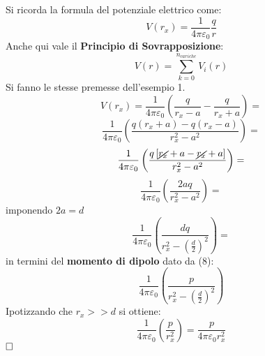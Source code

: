 Si ricorda la formula del potenziale elettrico come:
$$
  V(r_x) = \frac{1}{4 \pi \varepsilon_0}\frac{q}{r}
$$ 
Anche qui vale il \textbf{Principio di Sovrapposizione}:
$$
  V(r) = \sum_{k = 0}^{n_{cariche}}{V_i(r)}
$$
Si fanno le stesse premesse dell'esempio 1.\\
$$ V(r_x) = \frac{1}{4 \pi \varepsilon_0} \left(\frac{q}{r_x - a} - \frac{q}{r_x + a}\right) =
$$
$$
\frac{1}{4 \pi \varepsilon_0} \left(\frac{q(r_x + a) - q(r_x - a)}{r_x^2 - a^2}\right) = 
$$
$$
\frac{ 1 }{ 4 \pi \varepsilon_0 } \left( \frac{ q \left[ \cancel{ r_x } + a - \cancel{ r_x } + a \right] }{ r_x^2 - a^2 } \right) =
$$
$$
\frac{1}{4 \pi \varepsilon_0} \left(\frac{2aq}{r_x^2 - a^2}\right) =
$$
imponendo $2a = d$
$$
\frac{ 1 }{ 4 \pi \varepsilon_0 } 
\left( 
    \frac{ dq }{ r_x^2 - 
	\left( 
        \frac{ d }{ 2 } 
    \right) ^2 
    } 
\right) =
$$
in termini del \textbf{momento di dipolo} dato da (8):
$$
\frac{1}{4 \pi \varepsilon_0} \left(\frac{p}{r_x^2 - \left(\frac{d}{2}\right)^2}\right)
$$
Ipotizzando che $r_x >> d$ si ottiene:
$$
\frac{1}{4 \pi \varepsilon_0} \left(\frac{p}{r_x^2}\right) = \frac{ p }{ 4 \pi \varepsilon_0 r_x^2}
$$
$\hfill\square$ \\